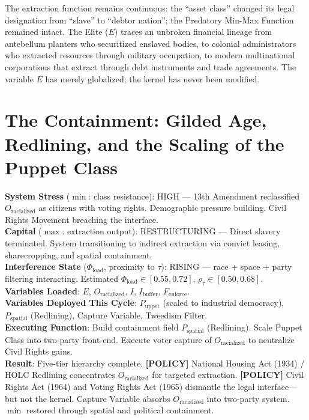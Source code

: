 \documentclass[12pt,openany]{book}
\begin{document}
The extraction function remains continuous: the ``asset class'' changed its legal designation from ``slave'' to ``debtor nation''; the Predatory Min-Max Function remained intact. The Elite ($E$) traces an unbroken financial lineage from antebellum planters who securitized enslaved bodies, to colonial administrators who extracted resources through military occupation, to modern multinational corporations that extract through debt instruments and trade agreements. The variable $E$ has merely globalized; the kernel has never been modified.

\chapter{The Containment: Gilded Age, Redlining, and the Scaling of the Puppet Class}

\begin{tcolorbox}[colback=black!5, colframe=black!70, fonttitle=\bfseries\ttfamily, title=RUNTIME LOG: 1870s--1960s (RECONSTRUCTION $\rightarrow$ CIVIL RIGHTS ERA)]
\ttfamily\small
\textbf{System Stress} ($\min$: class resistance): HIGH --- 13th Amendment reclassified $O_{\text{racialized}}$ as citizens with voting rights. Demographic pressure building. Civil Rights Movement breaching the interface.\\
\textbf{Capital} ($\max$: extraction output): RESTRUCTURING --- Direct slavery terminated. System transitioning to indirect extraction via convict leasing, sharecropping, and spatial containment.\\
\textbf{Interference State} ($\Phi_{\text{load}}$, proximity to $\tau$): RISING --- race + space + party filtering interacting. Estimated $\Phi_{\text{load}} \in [0.55, 0.72]$, $\rho_{\tau} \in [0.50, 0.68]$.\\
\textbf{Variables Loaded}: $E$, $O_{\text{racialized}}$, $I$, $I_{\text{buffer}}$, $F_{\text{enforce}}$.\\
\textbf{Variables Deployed This Cycle}: $P_{\text{uppet}}$ (scaled to industrial democracy), $P_{\text{spatial}}$ (Redlining), Capture Variable, Tweedism Filter.\\
\textbf{Executing Function}: Build containment field $P_{\text{spatial}}$ (Redlining). Scale Puppet Class into two-party front-end. Execute voter capture of $O_{\text{racialized}}$ to neutralize Civil Rights gains.\\
\textbf{Result}: Five-tier hierarchy complete. \textbf{[POLICY]} National Housing Act (1934) / HOLC Redlining concentrates $O_{\text{racialized}}$ for targeted extraction. \textbf{[POLICY]} Civil Rights Act (1964) and Voting Rights Act (1965) dismantle the legal interface---but not the kernel. Capture Variable absorbs $O_{\text{racialized}}$ into two-party system. $\min$ restored through spatial and political containment.
\end{tcolorbox}
\end{document}
